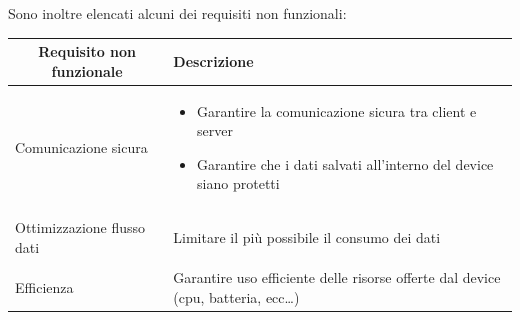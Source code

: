 \newpage

Sono inoltre elencati alcuni dei requisiti non funzionali:

\begin{center}
    

    \begin{tabular}{p{6cm}|p{8cm}}

    \toprule
    \multicolumn{1}{c}{\textbf{Requisito non funzionale}} &
    \textbf{Descrizione}\\

    \midrule
    Comunicazione sicura & \begin{itemize}
                            \item Garantire la comunicazione sicura tra client e server
                            \item Garantire che i dati salvati all'interno del device siano protetti
                           \end{itemize}\\\\
    Ottimizzazione flusso dati & Limitare il più possibile il consumo dei dati\\\\
    Efficienza & Garantire uso efficiente delle risorse offerte dal device (cpu, batteria, ecc\dots)\\

    \bottomrule

    \end{tabular}

\end{center}

